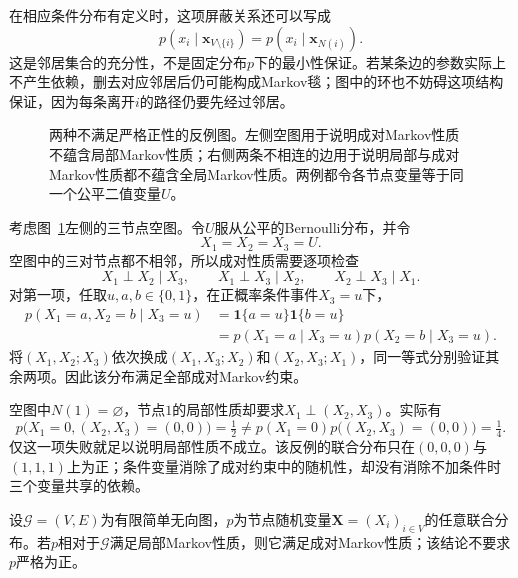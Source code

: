 在相应条件分布有定义时，这项屏蔽关系还可以写成
\begin{equation}
  p(x_i\mid\bm{x}_{V\setminus\{i\}})
  =p(x_i\mid\bm{x}_{N(i)}).
  \label{eq:pgm-undirected-blanket}
\end{equation}
这是邻居集合的充分性，不是固定分布$p$下的最小性保证。若某条边的参数实际上不产生依赖，删去对应邻居后仍可能构成Markov毯；图中的环也不妨碍这项结构保证，因为每条离开$i$的路径仍要先经过邻居。

\begin{figure}[htbp]
  \centering
  
  \caption{两种不满足严格正性的反例图。左侧空图用于说明成对Markov性质不蕴含局部Markov性质；右侧两条不相连的边用于说明局部与成对Markov性质都不蕴含全局Markov性质。两例都令各节点变量等于同一个公平二值变量$U$。}
  \label{fig:pgm-undirected-markov-counterexamples}
\end{figure}

\begin{example}[成对性质不蕴含局部性质]
  \label{ex:pgm-undirected-pairwise-not-local}
  考虑图~\ref{fig:pgm-undirected-markov-counterexamples}左侧的三节点空图。令$U$服从公平的Bernoulli分布，并令
  \[
    X_1=X_2=X_3=U.
  \]
  空图中的三对节点都不相邻，所以成对性质需要逐项检查
  \[
    X_1\perp X_2\mid X_3,\qquad
    X_1\perp X_3\mid X_2,\qquad
    X_2\perp X_3\mid X_1.
  \]
  对第一项，任取$u,a,b\in\{0,1\}$，在正概率条件事件$X_3=u$下，
  \[
    \begin{aligned}
      p(X_1=a,X_2=b\mid X_3=u)
      &=\mathbf{1}\{a=u\}\mathbf{1}\{b=u\}\\
      &=p(X_1=a\mid X_3=u)p(X_2=b\mid X_3=u).
    \end{aligned}
  \]
  将$(X_1,X_2;X_3)$依次换成$(X_1,X_3;X_2)$和$(X_2,X_3;X_1)$，同一等式分别验证其余两项。因此该分布满足全部成对Markov约束。

  空图中$N(1)=\varnothing$，节点$1$的局部性质却要求$X_1\perp(X_2,X_3)$。实际有
  \[
    p\bigl(X_1=0,(X_2,X_3)=(0,0)\bigr)=\tfrac12
    \neq
    p(X_1=0)p\bigl((X_2,X_3)=(0,0)\bigr)=\tfrac14.
  \]
  仅这一项失败就足以说明局部性质不成立。该反例的联合分布只在$(0,0,0)$与$(1,1,1)$上为正；条件变量消除了成对约束中的随机性，却没有消除不加条件时三个变量共享的依赖。
\end{example}

\begin{theorem}[局部Markov性质蕴含成对Markov性质]
  \label{thm:pgm-undirected-local-to-pairwise}
  设$\mathcal{G}=(V,E)$为有限简单无向图，$p$为节点随机变量$\bm{X}=(X_i)_{i\in V}$的任意联合分布。若$p$相对于$\mathcal{G}$满足局部Markov性质，则它满足成对Markov性质；该结论不要求$p$严格为正。
\end{theorem}

